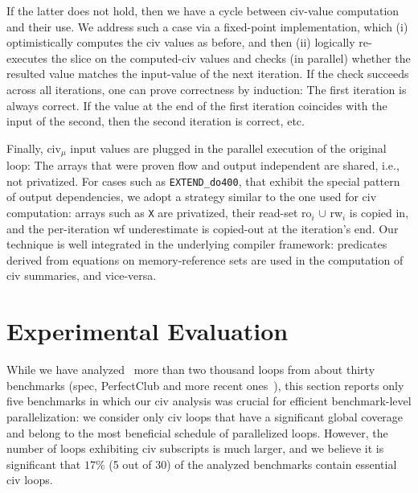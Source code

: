 \documentclass[10pt,nocopyrightspace]{sigplanconf}
\begin{document}
If the latter does not hold,  
then we have a cycle between {\sc civ}-value computation and their use.   
We address such a case via a fixed-point implementation,
which (i) optimistically computes the {\sc civ} values as before, and then (ii) logically 
re-executes the slice on the computed-{\sc civ} values and checks (in parallel) 
whether the resulted value matches the input-value of the next iteration. 
%
If the check succeeds across all iterations, one can prove correctness by induction:
The first iteration is always correct. If the value at the end of the first iteration 
coincides with the input of the second, then the second iteration 
is correct, etc.  

\enlargethispage{\baselineskip}

Finally, {\sc civ}$_\mu$ input values are plugged in the 
parallel execution of the original loop: The arrays that were proven flow and output
independent are shared, i.e., not privatized.   For cases such as {\tt EXTEND\_do400},
that exhibit the special pattern of output dependencies, we adopt a strategy similar
to the one used for {\sc civ} computation: arrays such as {\tt X} are privatized,
their read-set {\sc ro}$_i$ $\cup$ {\sc rw}$_i$ is copied in, and the per-iteration 
{\sc wf} underestimate
is copied-out at the iteration's end.   Our technique is well integrated in the
underlying compiler framework: predicates derived from equations on memory-reference 
sets are used in the computation of {\sc civ} summaries, and vice-versa.



\section{Experimental Evaluation}
\label{sec:EmpEval}

While we have analyzed~\cite{CosPLDI} more than two thousand loops from about thirty 
benchmarks ({\sc spec}, {\sc PerfectClub} and more recent ones~\cite{LexiFiPricing}), 
this section reports only five benchmarks in which our {\sc civ} analysis was crucial 
for efficient benchmark-level parallelization: we consider only 
{\sc civ} loops that have a significant global coverage and belong to the most
beneficial schedule of parallelized loops.   However, the number
of loops exhibiting {\sc civ} subscripts is much larger, and we believe
it is significant that $17\%$ (5 out of 30) of the analyzed benchmarks contain 
essential {\sc civ} loops. 
\end{document}
